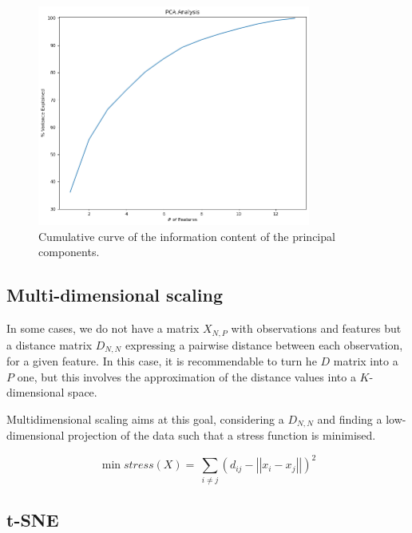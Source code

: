 \begin{figure}[hbt!]
\centering
\includegraphics[width=0.8\textwidth]{SectionLetsMath/dimensionalityReduction_figures/fig_PCAinformation.png}
\captionsetup{type=table}
\caption{Cumulative curve of the information content of the principal components.}
\label{fig_PCAinformation}
\end{figure}

\subsection{Multi-dimensional scaling} \label{secMultiDimensionalScaling}
In some cases, we do not have a matrix $X_{N,P}$ with observations and features but a distance matrix $D_{N,N}$ expressing a pairwise distance between each observation, for a given feature. In this case, it is recommendable to turn he $D$ matrix into a $P$ one, but this involves the approximation of the distance values into a $K$-dimensional space.\par

Multidimensional scaling aims at this goal, considering a $D_{N,N}$ and finding a low-dimensional projection of the data such that a stress function is minimised.

\begin{equation}
    \min stress\left(X\right)=\ {\sum_{i\neq j}\left(d_{ij}-\left|\left|x_i-x_j\right|\right|\right)}^2
    \label{eq_MDS}
\end{equation}

\subsection{t-SNE}

